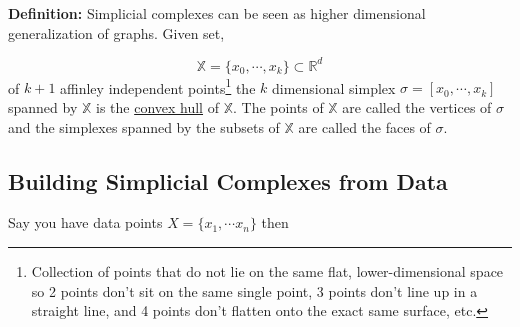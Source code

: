 \documentclass{article}
\begin{document}
\textbf{Definition:} Simplicial complexes can be seen as higher dimensional generalization of graphs. Given set,

\[\mathbb{X} = \{x_0,\cdots,x_k\}\subset \mathbb{R}^d\] of $k+1$ affinley independent points\footnote{Collection of points that do not lie on the same flat, lower-dimensional space so 2 points don't sit on the same single point, 3 points don't line up in a straight line, and 4 points don't flatten onto the exact same surface, etc.} the $k$ dimensional simplex $\sigma = [x_0,\cdots,x_k]$ spanned by $\mathbb{X}$ is the \href{https://en.wikipedia.org/wiki/Convex_hull}{convex hull} of $\mathbb{X}$. The points of $\mathbb{X}$ are called the vertices of $\sigma$ and the simplexes spanned by the subsets of $\mathbb{X}$ are called the faces of $\sigma$. 

\subsection{Building Simplicial Complexes from Data}

Say you have data points $X = \{x_1,\cdots x_n\}$ then   
\end{document}
